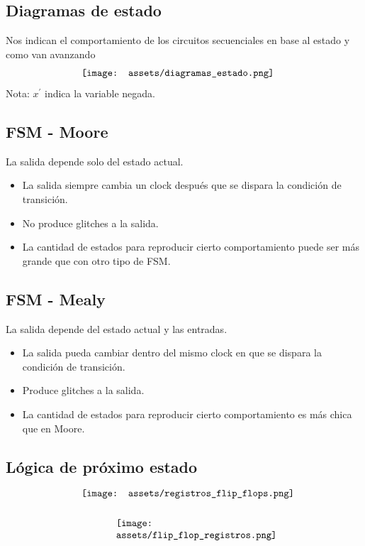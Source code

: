 \documentclass[10pt,a4paper]{article}
\begin{document}
\subsection*{Diagramas de estado}
Nos indican el comportamiento de los circuitos secuenciales en base al estado y como van avanzando
\[\begin{minipage}[b]{0.6\textwidth}
    \texttt{[image: assets/diagramas\_estado.png]}
    \label{fig:diagramas_estado}
\end{minipage}\]
Nota: \(x^{'}\) indica la variable negada.

\subsection*{FSM - Moore}
La salida depende solo del estado actual.
\begin{itemize}
    \item La salida siempre cambia un clock después que se dispara la condición de transición.
    \item No produce glitches a la salida.
    \item La cantidad de estados para reproducir cierto comportamiento puede ser más grande que con otro tipo de FSM.
\end{itemize}

\subsection*{FSM - Mealy}
La salida depende del estado actual y las entradas.
\begin{itemize}
    \item La salida pueda cambiar dentro del mismo clock en que se dispara la condición de transición.
    \item Produce glitches a la salida.
    \item La cantidad de estados para reproducir cierto comportamiento es más chica que en Moore.
\end{itemize}

\subsection*{Lógica de próximo estado}
\[\begin{minipage}[b]{0.6\textwidth}
    \texttt{[image: assets/registros\_flip\_flops.png]}
    \label{fig:registros_flip_flops}
\end{minipage}\]
\[\begin{minipage}[b]{0.4\textwidth}
    \texttt{[image: assets/flip\_flop\_registros.png]}
    \label{fig:flip_flop_registros}
\end{minipage}\]
\end{document}
